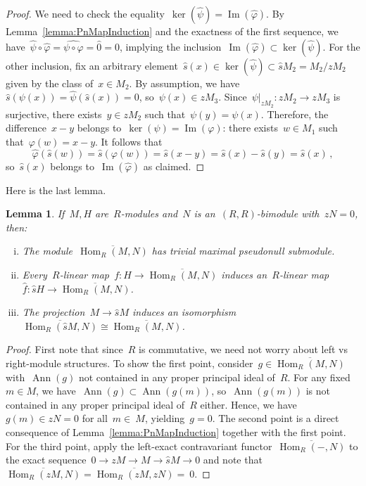 \documentclass[10.9pt,a4paper]{amsart}
\newtheorem{lemma}[theorem]{Lemma}
\theoremstyle{definition}
\theoremstyle{remark}
\newcommand{\Hom}{\operatorname{Hom}}
\newcommand{\shat}{\hat{s}}
\newcommand{\Ann}{\operatorname{Ann}}
\begin{document}
\begin{proof}
We need to check the equality~$\ker ( \hat \psi) = \operatorname{Im}(\hat \varphi)$. By Lemma~\ref{lemma:PnMapInduction} and the exactness of the first sequence, we have~$\hat \psi \circ \hat \varphi = \widehat{\psi \circ \varphi}=\widehat{0}=0$, implying the inclusion~$\operatorname{Im} (\hat \varphi ) \subset \ker(\hat \psi)$.
For the other inclusion, fix an arbitrary element~$\shat(x)\in \ker(\hat \psi)\subset\shat M_2=M_2/zM_2$ given by the class of~$x\in M_2$. By assumption, we have~$\shat (\psi(x)) = \hat\psi(\shat(x)) = 0$, so~$\psi(x) \in zM_3$. Since~$\psi\vert_{zM_2}\colon zM_2 \to zM_3$ is surjective, there exists~$y\in zM_2$ such that~$\psi(y) = \psi(x)$. Therefore, 
the difference~$x-y$ belongs to~$\ker(\psi)=\operatorname{Im}(\varphi)$: there exists~$w\in M_1$ such that~$\varphi(w) = x-y$. It follows that
\[
\hat \varphi( \shat(w)) =  \shat(\varphi(w)) = \shat(x-y)= \shat(x)-\shat(y)= \shat(x)\,,
\]
so~$\shat(x)$ belongs to~$\operatorname{Im}(\hat\varphi)$ as claimed.
\end{proof}

Here is the last lemma.

\begin{lemma}
\label{lemma:HomPN}
If~$M,H$ are~$R$-modules and~$N$ is an~$(R,R)$-bimodule with~$zN=0$, then:
\begin{enumerate}[(i)]
\item The module~$\overline{\Hom_R(M,N)}$ has trivial maximal pseudonull submodule.
\item Every~$R$-linear map~$f\colon H\to \overline{\Hom_R(M,N)}$ induces an~$R$-linear map~$\hat f \colon \shat H \to \overline{\Hom_R(M,N)}$.
\item The projection~$M\to \shat M$ induces an isomorphism~$\overline{\Hom_R(\shat M,N)} \cong \overline{\Hom_R(M,N)}$.
\end{enumerate}
\end{lemma}

\begin{proof}
First note that since~$R$ is commutative, we need not worry about left vs right-module structures.
To show the first point, consider~$g\in\overline{\Hom_R(M,N)}$ with~$\Ann(g)$ not contained in any proper principal ideal of~$R$. For any fixed~$m\in M$, we have~$\Ann(g)\subset\Ann(g(m))$, so~$\Ann(g(m))$ is not contained in any proper principal ideal of~$R$ either. Hence, we have~$g(m)\in zN=0$ for all~$m\in~M$, yielding~$g=0$.
The second point is a direct consequence of Lemma~\ref{lemma:PnMapInduction} together with the first point.
For the third point, apply the left-exact contravariant functor~$\overline{\Hom_R(-,N)}$ to the
exact sequence~$0\to zM\to M\to \shat M\to 0$ and note that~$\overline{\Hom_R(zM,N)}=\overline{\Hom_R(zM,zN)}=~0$.
\end{proof}



%


\end{document}
